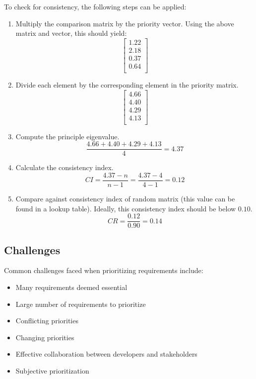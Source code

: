 \documentclass[12pt,titlepage]{article}
\begin{document}
        To check for consistency, the following steps can be applied:
          \begin{enumerate}
            \item Multiply the comparison matrix by the priority vector. Using the above matrix and vector, this should yield:
            $$
              \begin{bmatrix}
                1.22 \\
                2.18 \\
                0.37 \\
                0.64 \\
              \end{bmatrix}
            $$

            \item Divide each element by the corresponding element in the priority matrix.
            $$
              \begin{bmatrix}
                4.66 \\
                4.40 \\
                4.29 \\
                4.13 \\
              \end{bmatrix}
            $$

            \item Compute the principle eigenvalue.
            $$
              \frac{4.66 + 4.40 + 4.29 + 4.13}{4} = 4.37
            $$

            \item Calculate the consistency index.
            $$
              CI = \frac{4.37 - n}{n - 1} = \frac{4.37 - 4}{4 - 1} = 0.12
            $$

            \item Compare against consistency index of random matrix (this value can be found in a lookup table). Ideally, this consistency index should
              be below $0.10$.
            $$
              CR = \frac{0.12}{0.90} = 0.14
            $$
          \end{enumerate}

    \subsection{Challenges}
      Common challenges faced when prioritizing requirements include:
      \begin{itemize}
        \item Many requirements deemed essential
        \item Large number of requirements to prioritize
        \item Conflicting priorities
        \item Changing priorities
        \item Effective collaboration between developers and stakeholders
        \item Subjective prioritization
      \end{itemize}
\end{document}
